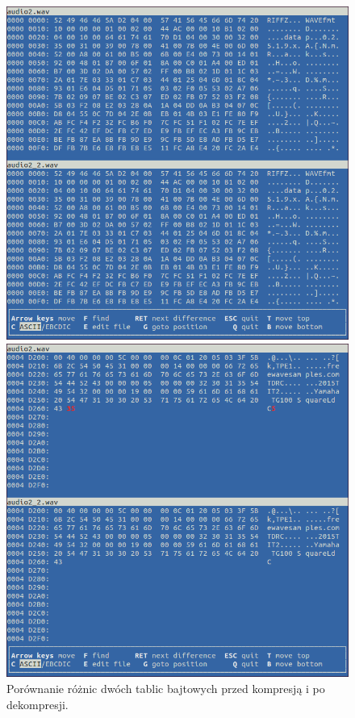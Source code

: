 \documentclass[12pt,a4paper,notitlepage]{report}
\begin{document}
\begin{figure}[H]
	\centering
	\begin{minipage}{0.45\textwidth}
		\centering
		\includegraphics[scale=.3]{audio2_beg}
	\end{minipage}\hfill
	\begin{minipage}{0.45\textwidth}
		\centering
		\includegraphics[scale=.3]{audio2_end}
	\end{minipage}
	\caption{Porównanie różnic dwóch tablic bajtowych przed kompresją i po dekompresji.}	
\end{figure}
\end{document}
